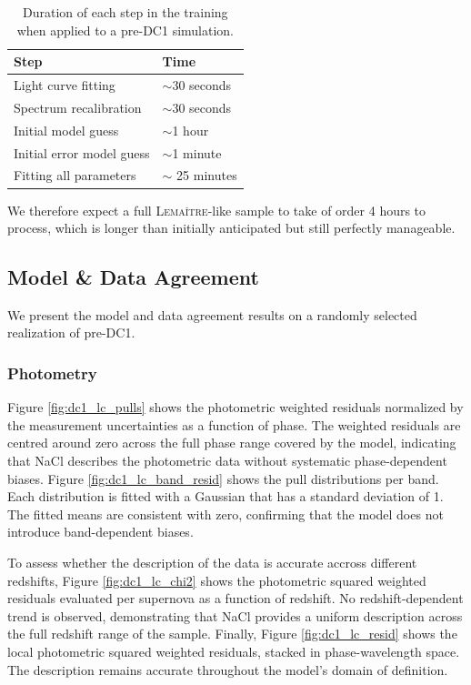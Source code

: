 \begin{table}[ht]
    \centering
    \begin{tabular}{ l | l }
    \hline
        Step & Time \\
        \hline
        Light curve fitting & $\sim$30 seconds\\
        \hline
        Spectrum recalibration & $\sim$30 seconds\\
        \hline
        Initial model guess & $\sim$1 hour\\
        \hline
        Initial error model guess & $\sim$1 minute\\
        \hline
        Fitting all parameters & $\sim$ 25 minutes \\
    \hline
    \end{tabular}
    \caption{Duration of each step in the training when applied to a pre-DC1 simulation.}
    \label{tab:pre_dc_log}
\end{table}
We therefore expect a full 
\textsc{Lemaître}-like sample to take of order 4 hours to process, which is longer 
than initially anticipated but still perfectly manageable.


\subsection{Model \& Data Agreement}

We present the model and data agreement results on a randomly selected 
realization of pre-DC1.

\subsubsection{Photometry}

Figure \ref{fig:dc1_lc_pulls} shows the photometric weighted 
residuals normalized by the measurement uncertainties as a function 
of phase. The weighted residuals are centred around zero across the full phase 
range covered by the model, indicating that NaCl describes the 
photometric data without systematic phase-dependent biases. 
Figure \ref{fig:dc1_lc_band_resid} shows the pull distributions 
per band. Each distribution is fitted with a Gaussian that has a standard deviation of 1. 
The fitted means are 
consistent with zero, confirming that the model does not 
introduce band-dependent biases.

To assess whether the description of the data is accurate accross different redshifts, Figure \ref{fig:dc1_lc_chi2} shows 
the photometric squared weighted residuals evaluated per supernova as a function of 
redshift. 
No redshift-dependent trend is observed, demonstrating 
that NaCl provides a uniform description across the full redshift 
range of the sample. Finally, Figure \ref{fig:dc1_lc_resid} shows 
the local photometric squared weighted residuals, stacked in phase-wavelength space. 
The description remains accurate throughout the model's domain of 
definition.

